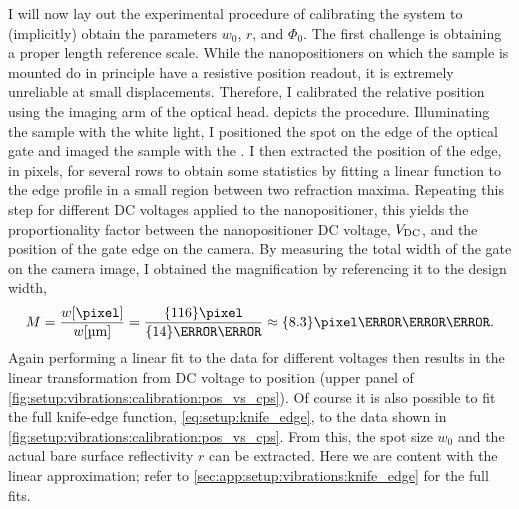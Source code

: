 I will now lay out the experimental procedure of calibrating the system to (implicitly) obtain the parameters $w_0$, $r$, and $\Phi_0$.
The first challenge is obtaining a proper length reference scale.
While the nanopositioners on which the sample is mounted do in principle have a resistive position readout, it is extremely unreliable at small displacements.
Therefore, I calibrated the relative position using the imaging arm of the optical head.
 depicts the procedure.
Illuminating the sample with the white light, I positioned the spot on the edge of the optical gate and imaged the sample with the \cmoscam.
I then extracted the position of the edge, in pixels, for several rows to obtain some statistics by fitting a linear function to the edge profile in a small region between two refraction maxima.
Repeating this step for different DC voltages applied to the nanopositioner, this yields the proportionality factor between the nanopositioner DC voltage, $V_{\mathrm{DC}}$, and the position of the gate edge on the camera.
By measuring the total width of the gate on the camera image, I obtained the magnification by referencing it to the design width,
\begin{equation}\label{eq:setup:knife_edge:magnification}
    M = \frac{w[\unit{\pixel}]}{w[\unit{\micro\meter}]} = \frac{\qty{116}{\pixel}}{\qty{14}{\micro\meter}} \approx \qty{8.3}{\pixel\per\micro\meter}.
\end{equation}
Again performing a linear fit to the data for different voltages then results in the linear transformation from DC voltage to position (upper panel of \cref{fig:setup:vibrations:calibration:pos_vs_cps}).
Of course it is also possible to fit the full knife-edge function, \cref{eq:setup:knife_edge}, to the data shown in \cref{fig:setup:vibrations:calibration:pos_vs_cps}.
From this, the spot size $w_0$ and the actual bare  surface reflectivity $r$ can be extracted.
Here we are content with the linear approximation; refer to \cref{sec:app:setup:vibrations:knife_edge} for the full fits.

